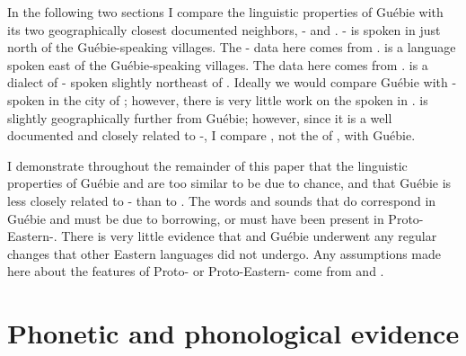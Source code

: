 \documentclass[output=paper,modfonts]{langscibook}
\begin{document}
In the following two sections I compare the linguistic properties of Guébie with its two geographically closest documented neighbors, - and . - is spoken in just north of the Guébie-speaking villages. The - data here comes from \cite{Marchese1979, Zogbo2005, Koopman1984}.  is a  language spoken east of the Guébie-speaking villages. The data here comes from \cite{Marchese1979, Kaye1981, Kaye1982, Koopman1984}.  is a dialect of - spoken slightly northeast of . Ideally we would compare Guébie with - spoken in the city of ; however, there is very little work on the  spoken in .  is slightly geographically further from Guébie; however, since it is a well documented and closely related to -, I compare , not the  of , with Guébie.

I demonstrate throughout the remainder of this paper that the linguistic properties of Guébie and  are too similar to be due to chance, and that Guébie is less closely related to - than to . The words and sounds that do correspond in Guébie and  must be due to borrowing, or must have been present in Proto-Eastern-. There is very little evidence that  and Guébie underwent any regular changes that other Eastern  languages did not undergo. Any assumptions made here about the features of Proto- or Proto-Eastern- come from \cite{Marchese1979} and \cite{Marchese2012}.



\section{Phonetic and phonological evidence}\label{sec:sande:P-side}
\end{document}
